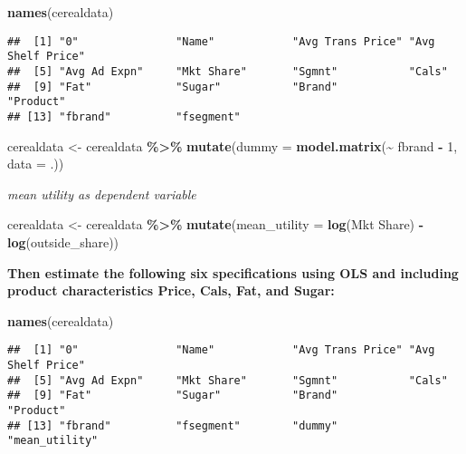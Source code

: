 \documentclass[
]{article}
\newenvironment{Shaded}{\begin{snugshade}}{\end{snugshade}}
\newcommand{\AttributeTok}[1]{\textcolor[rgb]{0.13,0.29,0.53}{#1}}
\newcommand{\DecValTok}[1]{\textcolor[rgb]{0.00,0.00,0.81}{#1}}
\newcommand{\FunctionTok}[1]{\textcolor[rgb]{0.13,0.29,0.53}{\textbf{#1}}}
\newcommand{\NormalTok}[1]{#1}
\newcommand{\OtherTok}[1]{\textcolor[rgb]{0.56,0.35,0.01}{#1}}
\newcommand{\SpecialCharTok}[1]{\textcolor[rgb]{0.81,0.36,0.00}{\textbf{#1}}}
\newcommand{\StringTok}[1]{\textcolor[rgb]{0.31,0.60,0.02}{#1}}
\begin{document}
\begin{Shaded}
\begin{Highlighting}[]
\FunctionTok{names}\NormalTok{(cerealdata)}
\end{Highlighting}
\end{Shaded}

\begin{verbatim}
##  [1] "0"               "Name"            "Avg Trans Price" "Avg Shelf Price"
##  [5] "Avg Ad Expn"     "Mkt Share"       "Sgmnt"           "Cals"           
##  [9] "Fat"             "Sugar"           "Brand"           "Product"        
## [13] "fbrand"          "fsegment"
\end{verbatim}

\begin{Shaded}
\begin{Highlighting}[]
\NormalTok{cerealdata }\OtherTok{\textless{}{-}}\NormalTok{ cerealdata }\SpecialCharTok{\%\textgreater{}\%}
  \FunctionTok{mutate}\NormalTok{(}\AttributeTok{dummy =} \FunctionTok{model.matrix}\NormalTok{(}\SpecialCharTok{\textasciitilde{}}\NormalTok{ fbrand }\SpecialCharTok{{-}} \DecValTok{1}\NormalTok{, }\AttributeTok{data =}\NormalTok{ .))}
\end{Highlighting}
\end{Shaded}

\emph{mean utility as dependent variable}

\begin{Shaded}
\begin{Highlighting}[]
\NormalTok{cerealdata }\OtherTok{\textless{}{-}}\NormalTok{ cerealdata }\SpecialCharTok{\%\textgreater{}\%}
  \FunctionTok{mutate}\NormalTok{(}\AttributeTok{mean\_utility =} \FunctionTok{log}\NormalTok{(}\StringTok{\textasciigrave{}}\AttributeTok{Mkt Share}\StringTok{\textasciigrave{}}\NormalTok{) }\SpecialCharTok{{-}} \FunctionTok{log}\NormalTok{(outside\_share))}
\end{Highlighting}
\end{Shaded}

\textbf{Then estimate the following six specifications using OLS and
including product characteristics Price, Cals, Fat, and Sugar:}

\begin{Shaded}
\begin{Highlighting}[]
\FunctionTok{names}\NormalTok{(cerealdata)}
\end{Highlighting}
\end{Shaded}

\begin{verbatim}
##  [1] "0"               "Name"            "Avg Trans Price" "Avg Shelf Price"
##  [5] "Avg Ad Expn"     "Mkt Share"       "Sgmnt"           "Cals"           
##  [9] "Fat"             "Sugar"           "Brand"           "Product"        
## [13] "fbrand"          "fsegment"        "dummy"           "mean_utility"
\end{verbatim}
\end{document}
